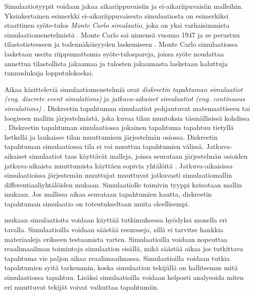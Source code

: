 \documentclass[utf8]{gradu3}
\begin{document}
Simulaatiotyypit voidaan jakaa aikariippuvaisiin ja ei-aikariipuvaisiin malleihin.
Yksinkertainen esimerkki ei-aikariippuvaisesta simulaatiosta on esimerkiksi staattinen 
syöte-tulos
\textit{Monte Carlo simulaatio}, joka on yksi varhaisimmista simulaatiomenetelmistä
\parencites%
    {historyOfSimulation1996}%
    {historyOfMonte}
\relax
%
. 
Monte Carlo sai nimensä vuonna 1947 \parencite{historyOfMonte}
ja se perustuu tilastotieteeseen ja todennäköisyyden laskemiseen
\parencite{historyOfSimulation1996}.
Monte Carlo simulaatiossa lasketaan useita riippumattomia syöte-tulospareja,
joissa syöte noudattaa annettua tilastollista jakaumaa 
ja tulosten jakaumasta lasketaan haluttuja tunnuslukuja lopputulokseksi.

Aikaa käsitteleviä simulaatiomenetelmiä ovat 
\textit{diskreetin tapahtuman simulaatiot (eng. discrete event simulations)}
ja \textit{jatkuva-aikaiset simulaatiot  (eng. continuous simulations)}
\parencite{historyOfSimulation1996}.
Diskreetin tapahtuman simulaatiot pohjautuvat matemaattiseen tai loogiseen
malliin järjestelmästä, joka kuvaa tilan muutoksia täsmällisissä kohdissa
\parencite{historyOfSimulation1996}. 
Diskreetin tapahtuman simulaatiossa jokainen tapahtuma tapahtuu tietyllä 
hetkellä ja laukaisee tilan muuttumisen järjestelmän osiossa.
Diskreetin tapahtuman simulaatiossa tila ei voi muuttua tapahtumien välissä.
Jatkuva-aikaiset simulaatiot taas käyttävät malleja, joissa seurataan 
järjestelmän osioiden jatkuva-aikaista muuttumista käyttäen sopivia 
yhtälöitä \parencite{historyOfSimulation1996}. 
Jatkuva-aikaisissa simulaatioissa järjestemän muuttujat muuttuvat 
jatkuvasti simulaatiomallin differentiaaliyhtälöiden mukaan.
Simulaatiolle toimivin tyyppi katsotaan mallin mukaan. 
Jos mallissa aikaa seurataan tapahtumien kautta, 
diskreetin tapahtuman simulaatio on toteutukseltaan muita oleellisempi.

\cite{banks1999introduction} mukaan simulaatioita voidaan 
käyttää tutkimuksessa hyödyksi monella eri tavalla.
Simulaatioilla voidaan säästää resursseja, sillä ei tarvitse hankkia materiaaleja erikseen testaamista varten. 
Simulaatioilla voidaan nopeuttaa reaalimaailman toimintoja simulaation sisällä,
mikä säästää aikaa jos tutkittava tapahtuma vie paljon aikaa reaalimaailmassa. Simulaatioilla voidaan tutkia tapahtumien syitä tarkemmin, koska simulaation tekijällä on hallitsemus mitä simulaatiossa tapahtuu.
Lisäksi simulaatioilla voidaan helposti analysoida miten eri muuttuvat tekijät voivat vaikuttaa tapahtumiin. 
\end{document}
